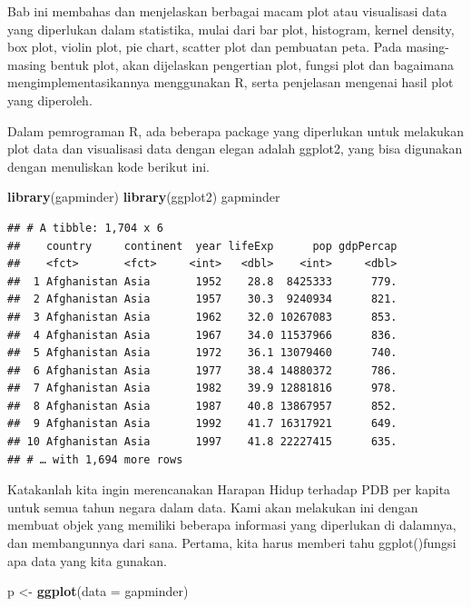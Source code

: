 \documentclass[
]{book}
\newenvironment{Shaded}{\begin{snugshade}}{\end{snugshade}}
\newcommand{\DataTypeTok}[1]{\textcolor[rgb]{0.13,0.29,0.53}{#1}}
\newcommand{\KeywordTok}[1]{\textcolor[rgb]{0.13,0.29,0.53}{\textbf{#1}}}
\newcommand{\NormalTok}[1]{#1}
\newcommand{\StringTok}[1]{\textcolor[rgb]{0.31,0.60,0.02}{#1}}
\begin{document}
Bab ini membahas dan menjelaskan berbagai macam plot atau visualisasi data yang diperlukan dalam statistika, mulai dari bar plot, histogram, kernel density, box plot, violin plot, pie chart, scatter plot dan pembuatan peta. Pada masing-masing bentuk plot, akan dijelaskan pengertian plot, fungsi plot dan bagaimana mengimplementasikannya menggunakan R, serta penjelasan mengenai hasil plot yang diperoleh.

Dalam pemrograman R, ada beberapa package yang diperlukan untuk melakukan plot data dan visualisasi data dengan elegan adalah ggplot2, yang bisa digunakan dengan menuliskan kode berikut ini.

\begin{Shaded}
\begin{Highlighting}[]
\KeywordTok{library}\NormalTok{(gapminder)}
\KeywordTok{library}\NormalTok{(ggplot2)}
\NormalTok{gapminder}
\end{Highlighting}
\end{Shaded}

\begin{verbatim}
## # A tibble: 1,704 x 6
##    country     continent  year lifeExp      pop gdpPercap
##    <fct>       <fct>     <int>   <dbl>    <int>     <dbl>
##  1 Afghanistan Asia       1952    28.8  8425333      779.
##  2 Afghanistan Asia       1957    30.3  9240934      821.
##  3 Afghanistan Asia       1962    32.0 10267083      853.
##  4 Afghanistan Asia       1967    34.0 11537966      836.
##  5 Afghanistan Asia       1972    36.1 13079460      740.
##  6 Afghanistan Asia       1977    38.4 14880372      786.
##  7 Afghanistan Asia       1982    39.9 12881816      978.
##  8 Afghanistan Asia       1987    40.8 13867957      852.
##  9 Afghanistan Asia       1992    41.7 16317921      649.
## 10 Afghanistan Asia       1997    41.8 22227415      635.
## # … with 1,694 more rows
\end{verbatim}

Katakanlah kita ingin merencanakan Harapan Hidup terhadap PDB per kapita untuk semua tahun negara dalam data. Kami akan melakukan ini dengan membuat objek yang memiliki beberapa informasi yang diperlukan di dalamnya, dan membangunnya dari sana. Pertama, kita harus memberi tahu ggplot()fungsi apa data yang kita gunakan.

\begin{Shaded}
\begin{Highlighting}[]
\NormalTok{p \textless{}{-}}\StringTok{ }\KeywordTok{ggplot}\NormalTok{(}\DataTypeTok{data =}\NormalTok{ gapminder)}
\end{Highlighting}
\end{Shaded}
\end{document}
